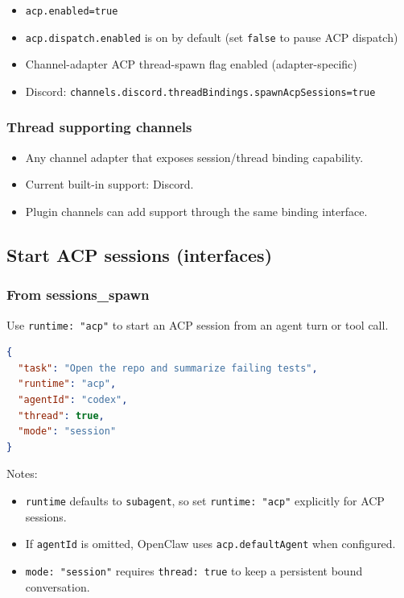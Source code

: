 \begin{itemize}
  \item \texttt{acp.enabled=true}
  \item \texttt{acp.dispatch.enabled} is on by default (set \texttt{false} to pause ACP dispatch)
  \item Channel-adapter ACP thread-spawn flag enabled (adapter-specific)
  \item Discord: \texttt{channels.discord.threadBindings.spawnAcpSessions=true}
\end{itemize}


\subsubsection{Thread supporting channels}


\begin{itemize}
  \item Any channel adapter that exposes session/thread binding capability.
  \item Current built-in support: Discord.
  \item Plugin channels can add support through the same binding interface.
\end{itemize}


\subsection{Start ACP sessions (interfaces)}


\subsubsection{From sessions\_spawn}


Use \texttt{runtime: "acp"} to start an ACP session from an agent turn or tool call.

\begin{lstlisting}[language=json]
{
  "task": "Open the repo and summarize failing tests",
  "runtime": "acp",
  "agentId": "codex",
  "thread": true,
  "mode": "session"
}
\end{lstlisting}


Notes:

\begin{itemize}
  \item \texttt{runtime} defaults to \texttt{subagent}, so set \texttt{runtime: "acp"} explicitly for ACP sessions.
  \item If \texttt{agentId} is omitted, OpenClaw uses \texttt{acp.defaultAgent} when configured.
  \item \texttt{mode: "session"} requires \texttt{thread: true} to keep a persistent bound conversation.
\end{itemize}


